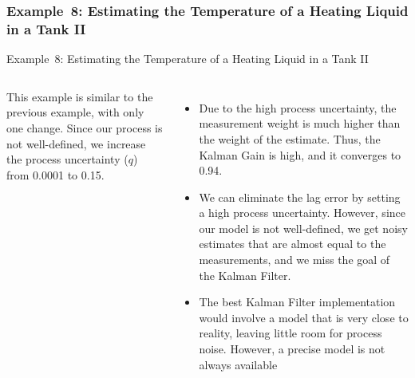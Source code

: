 \subsubsection{Example~8: Estimating the Temperature of a Heating Liquid in a Tank II}
\begin{frame}{Example~8: Estimating the Temperature of a Heating Liquid in a Tank II} 
\begin{columns}
    This example is similar to the previous example, with only one change. Since our process is not well-defined, we increase the process uncertainty ($q$) from 0.0001 to 0.15.
    \begin{itemize}
        \item Due to the high process uncertainty, the measurement weight is much higher than the weight of the estimate. Thus, the Kalman Gain is high, and it converges to 0.94.
        \item We can eliminate the lag error by setting a high process uncertainty. However, since our model is not well-defined, we get noisy estimates that are almost equal to the measurements, and we miss the goal of the Kalman Filter.
        \item The best Kalman Filter implementation would involve a model that is very close to reality, leaving little room for process noise. However, a precise model is not always available 
    \end{itemize}
    

\end{columns}
\end{frame}
